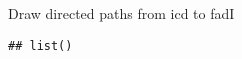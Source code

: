 \documentclass[
]{article}
\newenvironment{Shaded}{\begin{snugshade}}{\end{snugshade}}
\newcommand{\AttributeTok}[1]{\textcolor[rgb]{0.77,0.63,0.00}{#1}}
\newcommand{\ConstantTok}[1]{\textcolor[rgb]{0.00,0.00,0.00}{#1}}
\newcommand{\FunctionTok}[1]{\textcolor[rgb]{0.00,0.00,0.00}{#1}}
\newcommand{\NormalTok}[1]{#1}
\newcommand{\SpecialCharTok}[1]{\textcolor[rgb]{0.00,0.00,0.00}{#1}}
\newcommand{\StringTok}[1]{\textcolor[rgb]{0.31,0.60,0.02}{#1}}
\begin{document}
Draw directed paths from icd to fadI

\begin{Shaded}
\end{Shaded}

\begin{verbatim}
## list()
\end{verbatim}
\end{document}
